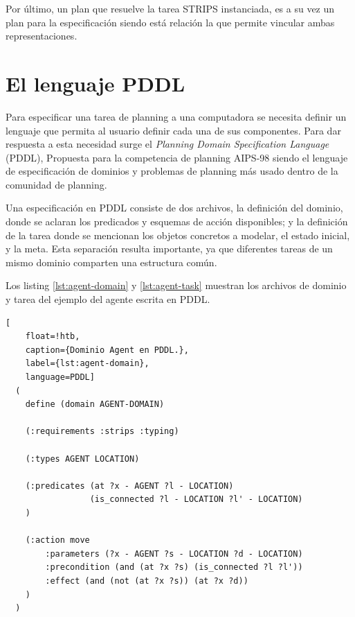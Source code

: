 Por último, un plan que resuelve la tarea STRIPS instanciada, es a su vez un
plan para la especificación siendo está relación la que permite vincular ambas
representaciones.

\section{El lenguaje PDDL}

Para especificar una tarea de planning a una computadora se necesita definir un
lenguaje que permita al usuario definir cada una de sus componentes. Para dar
respuesta a esta necesidad surge el \emph{Planning Domain Specification
Language} (PDDL), Propuesta para la competencia de planning AIPS-98
\citep{McDermott1998} siendo el lenguaje de especificación de dominios y
problemas de planning más usado dentro de la comunidad de planning.

Una especificación en PDDL consiste de dos archivos, la definición del dominio,
donde se aclaran los predicados y esquemas de acción disponibles; y la
definición de la tarea donde se mencionan los objetos concretos a modelar, el
estado inicial, y la meta. Esta separación resulta importante, ya que diferentes
tareas de un mismo dominio comparten una estructura común.

Los listing \ref{lst:agent-domain} y \ref{lst:agent-task} muestran los archivos
de dominio y tarea del ejemplo del agente escrita en PDDL.

\begin{lstlisting}[
    float=!htb,
    caption={Dominio Agent en PDDL.},
    label={lst:agent-domain},
    language=PDDL]
  (
    define (domain AGENT-DOMAIN)

    (:requirements :strips :typing)

    (:types AGENT LOCATION)

    (:predicates (at ?x - AGENT ?l - LOCATION)
                 (is_connected ?l - LOCATION ?l' - LOCATION)
    )

    (:action move
        :parameters (?x - AGENT ?s - LOCATION ?d - LOCATION)
        :precondition (and (at ?x ?s) (is_connected ?l ?l'))
        :effect (and (not (at ?x ?s)) (at ?x ?d))
    )
  )
\end{lstlisting}


